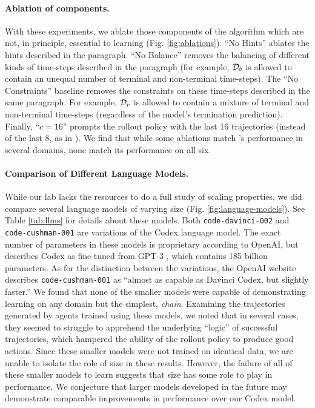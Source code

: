 \documentclass{article}
\newcommand\NoBalance{``No Balance''}
\newcommand\NoConstraints{``No Constraints''}
\newcommand\CSixteen{``$c=16$''}
\newcommand\NoHints{``No Hints''}
\begin{document}
\paragraph{Ablation of \Algorithm{} components.} With these experiments, we
ablate those components of the algorithm which are not, in principle, essential
to learning (Fig. \ref{fig:ablations}). \NoHints{} ablates the hints described in
the  paragraph. \NoBalance{} removes the balancing
of different kinds of time-steps described in the 
paragraph (for example, $\Buffer_{\Ter}$ is allowed to contain an unequal number
of terminal and non-terminal time-steps). The \NoConstraints{} baseline removes
the constraints on these time-steps described in the same paragraph. For
example,
$\Buffer_{\Rew}$ is allowed to contain a mixture of terminal and non-terminal
time-steps (regardless of the model's termination prediction). Finally, \CSixteen{} prompts the rollout
policy with the last 16 trajectories (instead of the last 8, as in
\Algorithm{}). We find that while some ablations match \Algorithm{}'s
performance in several domains, none match its performance on all six.
\paragraph{Comparison of Different Language Models.} While our lab lacks the
resources to do a full study of scaling properties, we did compare several
language models of varying size (Fig. \ref{fig:language-models}). See Table \ref{tab:llms} for details about
these models. Both \texttt{code-davinci-002} and \texttt{code-cushman-001} are
variations of the Codex language model. The exact number of parameters in these
models is proprietary according to OpenAI, but \cite{chen_evaluating_2021}
describes Codex as fine-tuned from GPT-3 \cite{brown_language_2020}, which
contains 185 billion parameters. As for the distinction between the variations,
the OpenAI website describes \texttt{code-cushman-001} as ``almost as capable as
Davinci Codex, but slightly faster.''
We found that none of the smaller models were capable of
demonstrating learning on any domain but the simplest, \emph{chain}.
Examining the trajectories generated by agents trained using these models, we
noted that in several cases, they seemed to struggle to apprehend the
underlying ``logic'' of successful trajectories, which hampered the ability
of the rollout policy to produce good actions.
Since these smaller models were not trained on identical data, we are unable to
isolate the role of size in these results. However, the failure of all of these
smaller models to learn suggests that size has some role to play in performance.
We conjecture that larger models developed in the future may demonstrate
comparable improvements in performance over our Codex model.
\end{document}
